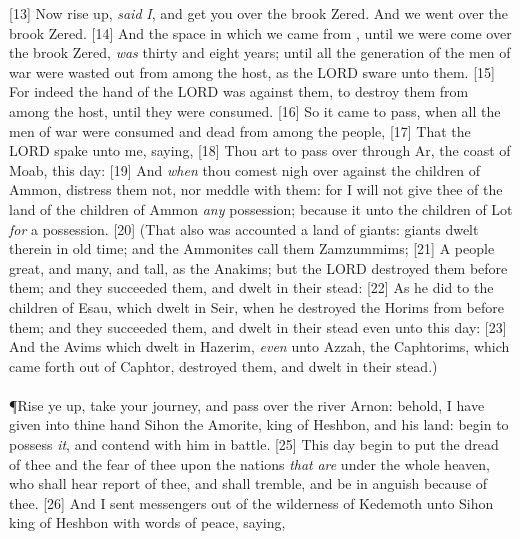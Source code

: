 [13] \textcolor[cmyk]{0.99998,1,0,0}{Now rise up, \emph{said} \emph{I}, and get you over the brook Zered. And we went over the brook Zered.}
[14] \textcolor[cmyk]{0.99998,1,0,0}{And the space in which we came from , until we were come over the brook Zered, \emph{was} thirty and eight years; until all the generation of the men of war were wasted out from among the host, as the LORD sware unto them.}
[15] \textcolor[cmyk]{0.99998,1,0,0}{For indeed the hand of the LORD was against them, to destroy them from among the host, until they were consumed.}
[16] \textcolor[cmyk]{0.99998,1,0,0}{So it came to pass, when all the men of war were consumed and dead from among the people,}
[17] \textcolor[cmyk]{0.99998,1,0,0}{That the LORD spake unto me, saying,}
[18] \textcolor[cmyk]{0.99998,1,0,0}{Thou art to pass over through Ar, the coast of Moab, this day:}
[19] \textcolor[cmyk]{0.99998,1,0,0}{And \emph{when} thou comest nigh over against the children of Ammon, distress them not, nor meddle with them: for I will not give thee of the land of the children of Ammon \emph{any} possession; because  it unto the children of Lot \emph{for} a possession.}
[20] \textcolor[cmyk]{0.99998,1,0,0}{(That also was accounted a land of giants: giants dwelt therein in old time; and the Ammonites call them Zamzummims;}
[21] \textcolor[cmyk]{0.99998,1,0,0}{A people great, and many, and tall, as the Anakims; but the LORD destroyed them before them; and they succeeded them, and dwelt in their stead:}
[22] \textcolor[cmyk]{0.99998,1,0,0}{As he did to the children of Esau, which dwelt in Seir, when he destroyed the Horims from before them; and they succeeded them, and dwelt in their stead even unto this day:}
[23] \textcolor[cmyk]{0.99998,1,0,0}{And the Avims which dwelt in Hazerim, \emph{even} unto Azzah, the Caphtorims, which came forth out of Caphtor, destroyed them, and dwelt in their stead.)}\\
\\
\P \textcolor[cmyk]{0.99998,1,0,0}{Rise ye up, take your journey, and pass over the river Arnon: behold, I have given into thine hand Sihon the Amorite, king of Heshbon, and his land: begin to possess \emph{it}, and contend with him in battle.}
[25] \textcolor[cmyk]{0.99998,1,0,0}{This day  begin to put the dread of thee and the fear of thee upon the nations \emph{that} \emph{are} under the whole heaven, who shall hear report of thee, and shall tremble, and be in anguish because of thee.}
[26] \textcolor[cmyk]{0.99998,1,0,0}{And I sent messengers out of the wilderness of Kedemoth unto Sihon king of Heshbon with words of peace, saying,}
